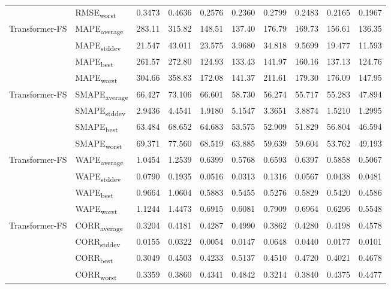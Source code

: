 {\begin{longtable}{l l c c c c c c c c}
 & RMSE\textsubscript{worst} & 0.3473 & 0.4636 & 0.2576 & 0.2360 & 0.2799 & 0.2483 & 0.2165 & 0.1967 \\
\cmidrule(lr){2-10}
\multirow{4}{*}{Transformer-FS} & MAPE\textsubscript{average} & 283.11 & 315.82 & 148.51 & 137.40 & 176.79 & 169.73 & 156.61 & 136.35 \\
 & MAPE\textsubscript{stddev} & 21.547 & 43.011 & 23.575 & 3.9680 & 34.818 & 9.5699 & 19.477 & 11.593 \\
 & MAPE\textsubscript{best} & 261.57 & 272.80 & 124.93 & 133.43 & 141.97 & 160.16 & 137.13 & 124.76 \\
 & MAPE\textsubscript{worst} & 304.66 & 358.83 & 172.08 & 141.37 & 211.61 & 179.30 & 176.09 & 147.95 \\
\cmidrule(lr){2-10}
\multirow{4}{*}{Transformer-FS} & SMAPE\textsubscript{average} & 66.427 & 73.106 & 66.601 & 58.730 & 56.274 & 55.717 & 55.283 & 47.894 \\
 & SMAPE\textsubscript{stddev} & 2.9436 & 4.4541 & 1.9180 & 5.1547 & 3.3651 & 3.8874 & 1.5210 & 1.2995 \\
 & SMAPE\textsubscript{best} & 63.484 & 68.652 & 64.683 & 53.575 & 52.909 & 51.829 & 56.804 & 46.594 \\
 & SMAPE\textsubscript{worst} & 69.371 & 77.560 & 68.519 & 63.885 & 59.639 & 59.604 & 53.762 & 49.193 \\
\cmidrule(lr){2-10}
\multirow{4}{*}{Transformer-FS} & WAPE\textsubscript{average} & 1.0454 & 1.2539 & 0.6399 & 0.5768 & 0.6593 & 0.6397 & 0.5858 & 0.5067 \\
 & WAPE\textsubscript{stddev} & 0.0790 & 0.1935 & 0.0516 & 0.0313 & 0.1316 & 0.0567 & 0.0438 & 0.0481 \\
 & WAPE\textsubscript{best} & 0.9664 & 1.0604 & 0.5883 & 0.5455 & 0.5276 & 0.5829 & 0.5420 & 0.4586 \\
 & WAPE\textsubscript{worst} & 1.1244 & 1.4473 & 0.6915 & 0.6081 & 0.7909 & 0.6964 & 0.6296 & 0.5548 \\
\cmidrule(lr){2-10}
\multirow{4}{*}{Transformer-FS} & CORR\textsubscript{average} & 0.3204 & 0.4181 & 0.4287 & 0.4990 & 0.3862 & 0.4280 & 0.4198 & 0.4578 \\
 & CORR\textsubscript{stddev} & 0.0155 & 0.0322 & 0.0054 & 0.0147 & 0.0648 & 0.0440 & 0.0177 & 0.0101 \\
 & CORR\textsubscript{best} & 0.3049 & 0.4503 & 0.4233 & 0.5137 & 0.4510 & 0.4720 & 0.4021 & 0.4678 \\
 & CORR\textsubscript{worst} & 0.3359 & 0.3860 & 0.4341 & 0.4842 & 0.3214 & 0.3840 & 0.4375 & 0.4477 \\

\end{longtable}}
